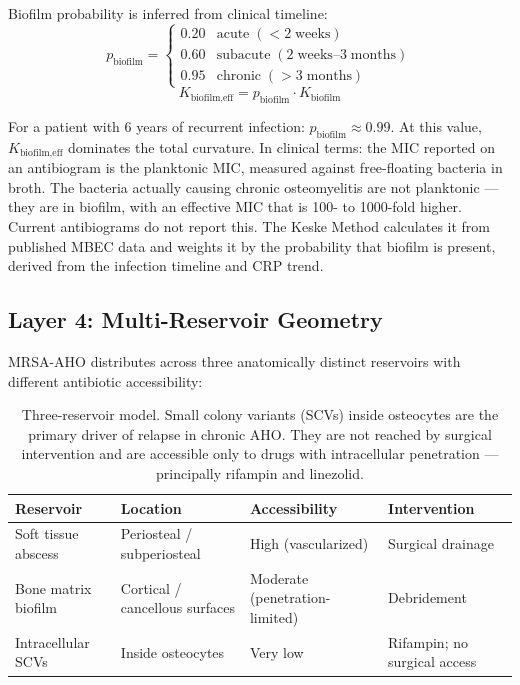 \documentclass[11pt]{article}
\begin{document}
Biofilm probability is inferred from clinical timeline:
\[
  p_{\text{biofilm}} = 
  \begin{cases}
    0.20 & \text{acute} \;(<\!2\;\text{weeks}) \\
    0.60 & \text{subacute} \;(2\;\text{weeks}–3\;\text{months}) \\
    0.95 & \text{chronic} \;(>\!3\;\text{months})
  \end{cases}
\]
\[
  K_{\text{biofilm,eff}} = p_{\text{biofilm}} \cdot K_{\text{biofilm}}
\]

For a patient with 6 years of recurrent infection: $p_{\text{biofilm}} \approx 0.99$.
At this value, $K_{\text{biofilm,eff}}$ dominates the total curvature. In clinical
terms: the MIC reported on an antibiogram is the planktonic MIC, measured against
free-floating bacteria in broth. The bacteria actually causing chronic osteomyelitis
are not planktonic — they are in biofilm, with an effective MIC that is 100- to
1000-fold higher. Current antibiograms do not report this. The Keske Method
calculates it from published MBEC data and weights it by the probability that
biofilm is present, derived from the infection timeline and CRP trend.

\subsection{Layer 4: Multi-Reservoir Geometry}

MRSA-AHO distributes across three anatomically distinct reservoirs with
different antibiotic accessibility:

\begin{table}[h!]
\centering
\small
\begin{tabular}{p{3.2cm} p{2.8cm} p{2.8cm} p{3.5cm}}
\toprule
\textbf{Reservoir} & \textbf{Location} & \textbf{Accessibility} & \textbf{Intervention} \\
\midrule
Soft tissue abscess & Periosteal / subperiosteal & High (vascularized) & Surgical drainage \\
Bone matrix biofilm & Cortical / cancellous surfaces & Moderate (penetration-limited) & Debridement \\
Intracellular SCVs & Inside osteocytes & Very low & Rifampin; no surgical access \\
\bottomrule
\end{tabular}
\caption{Three-reservoir model. Small colony variants (SCVs) inside osteocytes
are the primary driver of relapse in chronic AHO. They are not reached by
surgical intervention and are accessible only to drugs with intracellular
penetration — principally rifampin and linezolid.}
\end{table}
\end{document}
